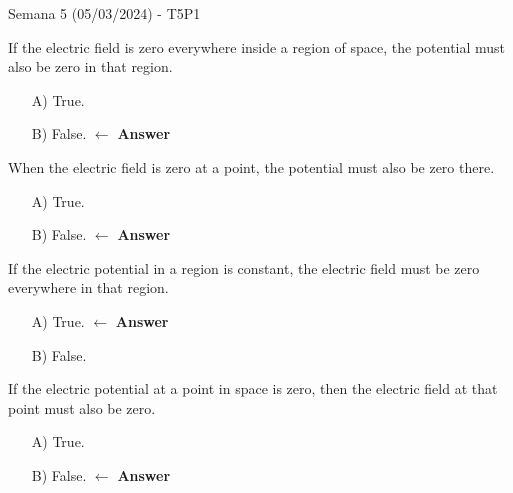 \begin{frame}{Semana 5 (05/03/2024) - T5P1}
    
    If the electric field is zero everywhere inside a region of space, the potential must also be zero in that region.
    
    \begin{itemize}
        \item[A)] True.
        \item[B)] False. $\leftarrow$ \textbf{Answer}
    \end{itemize}
    
    
    When the electric field is zero at a point, the potential must also be zero there.
    
    \begin{itemize}
        \item[A)] True.
        \item[B)] False. $\leftarrow$ \textbf{Answer}
    \end{itemize}
    
    If the electric potential in a region is constant, the electric field must be zero everywhere in that region.
    
    \begin{itemize}
        \item[A)] True. $\leftarrow$ \textbf{Answer}
        \item[B)] False.
    \end{itemize}
    
    If the electric potential at a point in space is zero, then the electric field at that point must also be zero.
    
    \begin{itemize}
        \item[A)] True.
        \item[B)] False. $\leftarrow$ \textbf{Answer}
    \end{itemize}
    
\end{frame}

